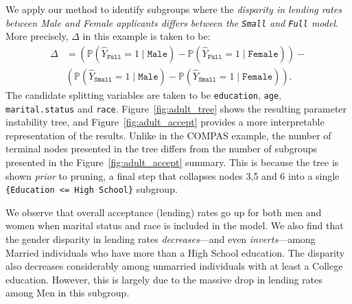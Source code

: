 \documentclass[11pt, sigconf, svgnames]{acmart}
\renewcommand{\P}{\mathbb{P}}
\begin{document}
We apply our method to identify subgroups where the \emph{disparity in lending rates between Male and Female applicants differs between the \texttt{Small} and \texttt{Full} model}.  More precisely, $\Delta$ in this example is taken to be:
\begin{align*}
  \Delta &= \left(\P(\hat Y_\texttt{Full} = 1 \mid \texttt{Male}) - \P(\hat Y_\texttt{Full} = 1 \mid \texttt{Female})\right) - \\
  &\left(\P(\hat Y_\texttt{Small} = 1 \mid \texttt{Male}) - \P(\hat Y_\texttt{Small} = 1 \mid \texttt{Female})\right).
\end{align*}
  The candidate splitting variables are taken to be \verb|education|, \verb|age|, \verb|marital.status| and \verb|race|.    Figure~\ref{fig:adult_tree} shows the resulting parameter instability tree, and Figure~\ref{fig:adult_accept} provides a more interpretable representation of the results.  Unlike in the COMPAS example, the number of terminal nodes presented in the tree differs from the number of subgroups presented in the Figure~\ref{fig:adult_accept} summary.  This is because the tree is shown \emph{prior} to pruning, a final step that collapses nodes 3,5 and 6 into a single \verb|{Education <= High School}| subgroup.

We observe that overall acceptance (lending) rates go up for both men and women when marital status and race is included in the model.  We also find that the gender disparity in lending rates \emph{decreases}---and even \emph{inverts}---among Married individuals who have more than a High School education.  The disparity also decreases considerably among unmarried individuals with at least a College education.  However, this is largely due to the massive drop in lending rates among Men in this subgroup.



\end{document}
